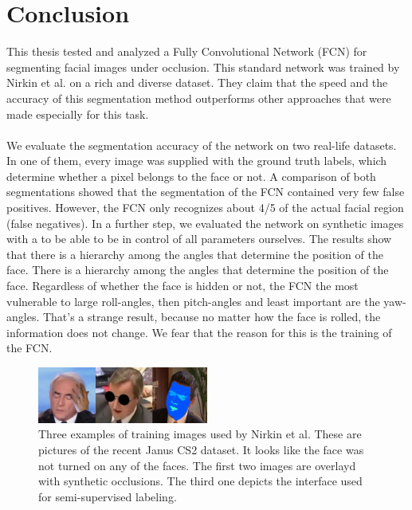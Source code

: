 \chapter{Conclusion}
This thesis tested and analyzed a Fully Convolutional Network (FCN) for segmenting facial images under occlusion. This standard network was trained by Nirkin et al. \cite{nirkin2018_faceswap} on a rich and diverse dataset. They claim that the speed and the accuracy of this segmentation method outperforms other approaches that were made especially for this task.\\
\\
We evaluate the segmentation accuracy of the network on two real-life datasets. In one of them, every image was supplied with the ground truth labels, which determine whether a pixel belongs to the face or not. A comparison of both segmentations showed that the segmentation of the FCN contained very few false positives. However, the FCN only recognizes about 4/5 of the actual facial region (false negatives). In a further step, we evaluated the network on synthetic images with a to be able to be in control of all parameters ourselves. The results show that there is a hierarchy among the angles that determine the position of the face. There is a hierarchy among the angles that determine the position of the face. Regardless of whether the face is hidden or not, the FCN the most vulnerable to large roll-angles, then pitch-angles and least important are the yaw-angles. That's a strange result, because no matter how the face is rolled, the information does not change. We fear that the reason for this is the training of the FCN. 

\begin{figure}
	\centering
	\includegraphics[width=0.5\textwidth]{Figures/chap5/tran_frames.png}
	\caption{Three examples of training images used by Nirkin et al. These are pictures of the recent Janus CS2 dataset. It looks like the face was not turned on any of the faces. The first two images are overlayd with synthetic occlusions. The third one depicts the interface used for semi-supervised labeling.}
	\label{fig:chap5:train_images}
\end{figure}

